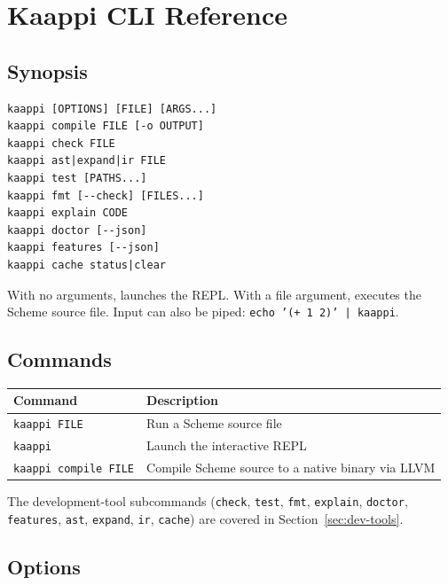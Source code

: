 \chapter{Kaappi CLI Reference}
\label{app:cli}

\section{Synopsis}

\begin{Verbatim}[fontsize=\small]
kaappi [OPTIONS] [FILE] [ARGS...]
kaappi compile FILE [-o OUTPUT]
kaappi check FILE
kaappi ast|expand|ir FILE
kaappi test [PATHS...]
kaappi fmt [--check] [FILES...]
kaappi explain CODE
kaappi doctor [--json]
kaappi features [--json]
kaappi cache status|clear
\end{Verbatim}

With no arguments, launches the REPL. With a file argument, executes the Scheme source file. Input can also be piped: \texttt{echo '(+ 1 2)' | kaappi}.

\section{Commands}

\begin{center}
\small
\begin{tabularx}{\textwidth}{@{}lY@{}}
\textbf{Command} & \textbf{Description} \\
\hline
\texttt{kaappi FILE} & Run a Scheme source file \\
\texttt{kaappi} & Launch the interactive REPL \\
\texttt{kaappi compile FILE} & Compile Scheme source to a native binary via LLVM \\
\end{tabularx}
\end{center}

The development-tool subcommands (\texttt{check}, \texttt{test}, \texttt{fmt}, \texttt{explain}, \texttt{doctor}, \texttt{features}, \texttt{ast}, \texttt{expand}, \texttt{ir}, \texttt{cache}) are covered in Section~\ref{sec:dev-tools}.

\section{Options}

